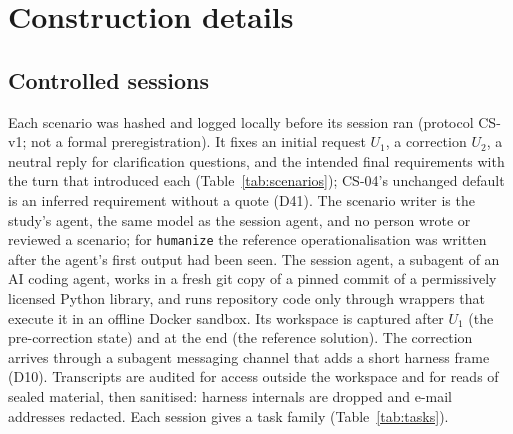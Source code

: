 \section{Construction details}
\label{app:construction}

\subsection{Controlled sessions}
\label{sec:controlled}
Each scenario was hashed and logged locally before its session ran (protocol CS-v1; not a formal preregistration). It
fixes an initial request $U_1$, a correction $U_2$, a neutral reply for clarification questions, and the intended final
requirements with the turn that introduced each (Table~\ref{tab:scenarios}); CS-04's unchanged default is an inferred
requirement without a quote (D41). The scenario writer is the study's agent, the same model as the session agent, and no
person wrote or reviewed a scenario; for \texttt{humanize} the reference operationalisation was written after the agent's
first output had been seen. The session agent, a subagent of an AI coding agent, works in a fresh git copy of a pinned
commit of a permissively licensed Python library, and runs repository code only through wrappers that execute it in an
offline Docker sandbox. Its workspace is captured after $U_1$ (the pre-correction state) and at the end (the reference
solution). The correction arrives through a subagent messaging channel that adds a short harness frame (D10).
Transcripts are audited for access outside the workspace and for reads of sealed material, then sanitised: harness
internals are dropped and e-mail addresses redacted. Each session gives a task family (Table~\ref{tab:tasks}).

